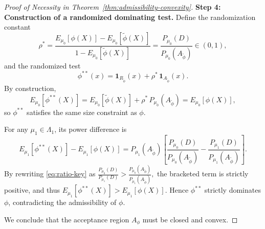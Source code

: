 \documentclass[12pt]{article}
\theoremstyle{definition}
\theoremstyle{remark}
\begin{document}
\begin{proof}[Proof of Necessity in Theorem~\ref{thm:admissibility-convexity}]
\medskip
\noindent
\textbf{Step 4: Construction of a randomized dominating test.}
Define the randomization constant
\[
\rho^*
=\frac{E_{\mu_0}[\phi(X)]-E_{\mu_0}[\tilde{\phi}(X)]}
{1-E_{\mu_0}[\tilde{\phi}(X)]}
=\frac{P_{\mu_0}(D)}{P_{\mu_0}(A_{\tilde{\phi}})} \in (0,1),
\]
and the randomized test
\[
\phi^{**}(x) = \mathbf{1}_{R_{\tilde{\phi}}}(x) + \rho^*\,\mathbf{1}_{A_{\tilde{\phi}}}(x).
\]
By construction,
\[
E_{\mu_0}[\phi^{**}(X)] = E_{\mu_0}[\tilde{\phi}(X)] + \rho^*\,P_{\mu_0}(A_{\tilde{\phi}}) 
= E_{\mu_0}[\phi(X)],
\]
so $\phi^{**}$ satisfies the same size constraint as $\phi$.

For any $\mu_1\in\Lambda_1$, its power difference is
\[
E_{\mu_1}[\phi^{**}(X)] - E_{\mu_1}[\phi(X)]
= P_{\mu_1}(A_{\tilde{\phi}})\!
\left[\frac{P_{\mu_0}(D)}{P_{\mu_0}(A_{\tilde{\phi}})} - \frac{P_{\mu_1}(D)}{P_{\mu_1}(A_{\tilde{\phi}})}\right].
\]
By rewriting \eqref{eq:ratio-key} as
\(
\frac{P_{\mu_0}(D)}{P_{\mu_1}(D)} > \frac{P_{\mu_0}(A_{\tilde{\phi}})}{P_{\mu_1}(A_{\tilde{\phi}})},
\)
the bracketed term is strictly positive, and thus
$E_{\mu_1}[\phi^{**}(X)] > E_{\mu_1}[\phi(X)]$.
Hence $\phi^{**}$ strictly dominates $\phi$, contradicting the admissibility of $\phi$.

\medskip
\noindent
We conclude that the acceptance region $A_\phi$ must be closed and convex.
\end{proof}
\end{document}
